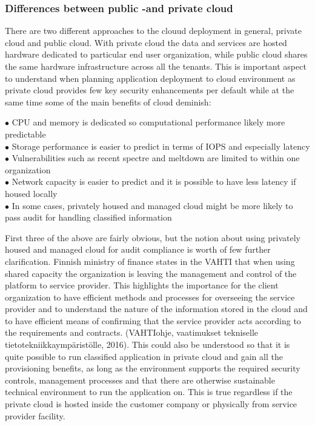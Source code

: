 \documentclass{article}
\begin{document}
\subsubsection{Differences between public -and private cloud}
There are two different approaches to the clouud deployment in general, private cloud and public cloud. With private cloud the data and services are hosted hardware dedicated to particular end user organization, while public cloud shares the same hardware infrastructure across all the tenants. This is important aspect to understand when planning application deployment to cloud environment as private cloud provides few key security enhancements per default while at the same time some of the main benefits of cloud deminish:
\begin{description}
	\item[$\bullet$ CPU and memory is dedicated so computational performance likely more predictable]
	\item[$\bullet$ Storage performance is easier to predict in terms of IOPS and especially latency]
	\item[$\bullet$ Vulnerabilities such as recent spectre and meltdown are limited to within one organization]
	\item[$\bullet$ Network capacity is easier to predict and it is possible to have less latency if housed locally]
	\item[$\bullet$ In some cases, privately housed and managed cloud might be more likely to pass audit for handling classified information]
\end{description}
First three of the above are fairly obvious, but the notion about using privately housed and managed cloud for audit compliance is worth of few further clarification. Finnish ministry of finance states in the VAHTI that when using shared capacity the organization is leaving the management and control of the platform to service provider. This highlights the  importance for the client organization to have efficient methods and processes for overseeing the service provider and to understand the nature of the information stored in the cloud and to have efficient means of confirming that the service provider acts according to the requirements and contracts. (VAHTIohje, vaatimukset tekniselle tietotekniikkaympäristölle, 2016). This could also be understood so that it is quite possible to run classified application in private cloud and gain all the provisioning benefits, as long as the environment supports the required security controls, management processes and that there are otherwise sustainable technical environment to run the application on. This is true regardless if the private cloud is hosted inside the customer company or physically from service provider facility.
\end{document}
